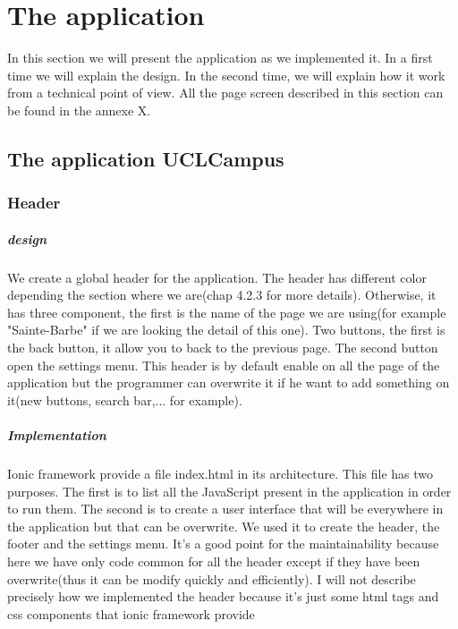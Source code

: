 \documentclass[11pt, a4paper]{report}
\begin{document}
\newpage

\chapter{The application}

In this section we will present the application as we implemented it. In a first time we will explain the design. In the second time, we will explain how it work from a technical point of view. All the page screen described in this section can be found in the annexe X.

\section{The application UCLCampus}

\subsection{Header}
\paragraph{design}
We create a global header for the application. The header has different color depending the section where we are(chap 4.2.3 for more details). Otherwise, it has three component, the first is the name of the page we are using(for example "Sainte-Barbe" if we are looking the detail of this one). Two buttons, the first is the back button, it allow you to back to the previous page. The second button open the settings menu. This header is by default enable on all the page of the application but the programmer can overwrite it if he want to add something on it(new buttons, search bar,... for example).
\paragraph{Implementation}
Ionic framework provide a file index.html in its architecture. This file has two purposes. The first is to list all the JavaScript present in the application in order to run them. The second is to create a user interface that will be everywhere in the application but that can be overwrite. We used it to create the header, the footer and the settings menu. It's a good point for the maintainability because here we have only code common for all the header except if they have been overwrite(thus it can be modify quickly and efficiently). I will not describe precisely how we implemented the header because it's just some html tags and css components that ionic framework provide
\end{document}
